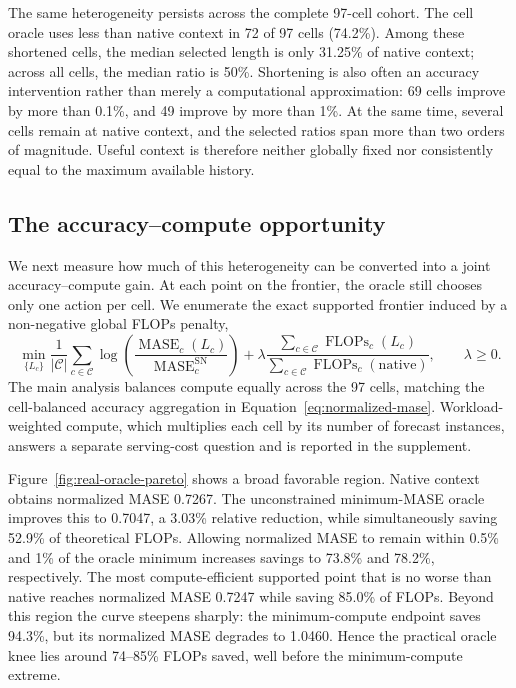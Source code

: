 The same heterogeneity persists across the complete 97-cell cohort.  The cell
oracle uses less than native context in 72 of 97 cells (74.2\%).  Among these shortened cells, the
median selected length is only 31.25\% of native context; across all cells, the
median ratio is 50\%.  Shortening is also often an accuracy intervention rather
than merely a computational approximation: 69 cells improve by more than
0.1\%, and 49 improve by more than 1\%.  At the same time, several cells remain
at native context, and the selected ratios span more than two orders of
magnitude.  Useful context is therefore neither globally fixed nor
consistently equal to the maximum available history.

\subsection{The accuracy--compute opportunity}
\label{sec:real-pareto}

We next measure how much of this heterogeneity can be converted into a joint
accuracy--compute gain.  At each point on the frontier, the oracle still chooses
only one action per cell.  We enumerate the exact supported frontier induced by
a non-negative global FLOPs penalty,
\begin{equation}
    \min_{\{L_c\}}
    \frac{1}{|\mathcal{C}|}
    \sum_{c\in\mathcal{C}}
       \log\!\left(
          \frac{\operatorname{MASE}_c(L_c)}
               {\operatorname{MASE}^{\mathrm{SN}}_c}
       \right)
    + \lambda
      \frac{\sum_{c\in\mathcal{C}}\operatorname{FLOPs}_c(L_c)}
           {\sum_{c\in\mathcal{C}}\operatorname{FLOPs}_c(\mathrm{native})},
    \qquad \lambda\geq 0.
    \label{eq:oracle-pareto}
\end{equation}
The main analysis balances compute equally across the 97 cells, matching the
cell-balanced accuracy aggregation in Equation~\ref{eq:normalized-mase}.
Workload-weighted compute, which multiplies each cell by its number of forecast
instances, answers a separate serving-cost question and is reported in the
supplement.

Figure~\ref{fig:real-oracle-pareto} shows a broad favorable region.  Native
context obtains normalized MASE 0.7267.  The unconstrained minimum-MASE oracle
improves this to 0.7047, a 3.03\% relative reduction, while simultaneously
saving 52.9\% of theoretical FLOPs.  Allowing normalized MASE to remain within
0.5\% and 1\% of the oracle minimum increases savings to 73.8\% and 78.2\%,
respectively.  The most compute-efficient supported point that is no worse than
native reaches normalized MASE 0.7247 while saving 85.0\% of FLOPs.  Beyond
this region the curve steepens sharply: the minimum-compute endpoint saves
94.3\%, but its normalized MASE degrades to 1.0460.  Hence the practical oracle
knee lies around 74--85\% FLOPs saved, well before the minimum-compute extreme.

